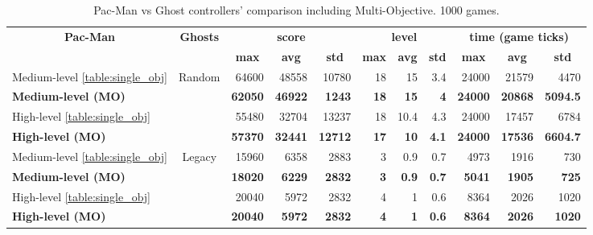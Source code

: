 \begin{sidewaystable}[h]
\centering
\begin{tabular}{|l|c|r|r|r|r|r|r|r|r|r|}
\hline
\multicolumn{1}{|c|}{\multirow{2}{*}{\textbf{Pac-Man}}} & \multirow{2}{*}{\textbf{Ghosts}} & \multicolumn{3}{c|}{\textbf{score}} & \multicolumn{3}{c|}{\textbf{level}} & \multicolumn{3}{c|}{\textbf{time (game ticks)}} \\ \cline{3-11} 
\multicolumn{1}{|c|}{} &  & \multicolumn{1}{c|}{\textbf{max}} & \multicolumn{1}{c|}{\textbf{avg}} & \multicolumn{1}{c|}{\textbf{std}} & \multicolumn{1}{c|}{\textbf{max}} & \multicolumn{1}{c|}{\textbf{avg}} & \multicolumn{1}{c|}{\textbf{std}} & \multicolumn{1}{c|}{\textbf{max}} & \multicolumn{1}{c|}{\textbf{avg}} & \multicolumn{1}{c|}{\textbf{std}} \\ \hline
Medium-level \ref{table:single_obj} & \multirow{4}{*}{Random} & {64600} & {48558} & {10780} & {18} & {15} & {3.4} & {24000} & {21579} & {4470} \\ \cline{1-1} \cline{3-11} 
\textbf{Medium-level (MO)} &  & \textbf{62050} & \textbf{46922} & \textbf{1243} & \textbf{18} & \textbf{15} & \textbf{4} & \textbf{24000} & \textbf{20868} & \textbf{5094.5} \\ \cline{1-1} \cline{3-11} 
{High-level \ref{table:single_obj}} &  & {55480} & {32704} & {13237} & {18} & {10.4} & {4.3} & {24000} & {17457} & {6784} \\ \cline{1-1} \cline{3-11} 
\textbf{High-level (MO)} &  & \textbf{57370} & \textbf{32441} & \textbf{12712} & \textbf{17} & \textbf{10} & \textbf{4.1} & \textbf{24000} & \textbf{17536} & \textbf{6604.7} \\ \hline
{Medium-level \ref{table:single_obj}} & \multirow{4}{*}{Legacy} & {15960} & {6358} & {2883} & {3} & {0.9} & {0.7} & {4973} & {1916} & {730} \\ \cline{1-1} \cline{3-11} 
\textbf{Medium-level (MO)} &  & \textbf{18020} & \textbf{6229} & \textbf{2832} & \textbf{3} & \textbf{0.9} & \textbf{0.7} & \textbf{5041} & \textbf{1905} & \textbf{725} \\ \cline{1-1} \cline{3-11} 
{High-level \ref{table:single_obj}} &  & {20040} & {5972} & {2832} & {4} & {1} & {0.6} & {8364} & {2026} & {1020} \\ \cline{1-1} \cline{3-11} 
\textbf{High-level (MO)} &  & \textbf{20040} & \textbf{5972} & \textbf{2832} & \textbf{4} & \textbf{1} & \textbf{0.6} & \textbf{8364} & \textbf{2026} & \textbf{1020} \\ \hline
\end{tabular}
\caption{Pac-Man vs Ghost controllers' comparison including Multi-Objective. 1000 games.}
\label{table:multi-objective}
\end{sidewaystable}

